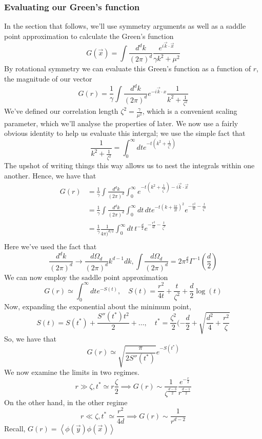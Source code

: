 \subsubsection{Evaluating our Green's function} 
In the section that follows, we'll use symmetry arguments 
as well as a saddle point approximation to calculate the Green's function 
\[
	G ( \vec{x} ) = \int \frac{ d^ d k }{ ( 2 \pi ) ^ d } \frac{ e^{ i \vec{k} \cdot  \vec{x}  }}{ \gamma k^2 + \mu ^ 2 }
\] By rotational symmetry we can evaluate this Green's function as 
a function of $ r $, the magnitude of our vector 
\[
	G ( r)  =\frac{1}{\gamma } \int \frac{ d^ d k }{ ( 2 \pi ) ^ d } e^{  - i \vec{k} \cdot  x } \frac{1}{ k^ 2 + \frac{1}{ \zeta ^ 2 }}
\] We've defined our correlation length $ \zeta^ 2 = \frac{ \gamma }{ \mu^ 2 }$, which 
is a convenient scaling parameter, which we'll analyse the properties of later.  
We now use a fairly obvious identity to help us evaluate this intergal; we use 
the simple fact that 
\[
	\frac{1}{ k ^ 2 + \frac{1}{ \zeta ^ 2} } = \int_0^\infty dt e^{  - t ( k^ 2 + \frac{1}{\zeta ^ 2} ) }
\] The upshot of writing things this way allows us 
to nest the integrals within one another. Hence, we have that  
\begin{align*}
	G ( r) &=  \frac{1}{\gamma} \int \frac{d^ d k }{ ( 2 \pi ) ^ d } \int_0^\infty e^{  - t ( k^ 2 + \frac{1}{\zeta ^ 2 }) - i \vec{k} \cdot  \vec{x} } \\
	       &=  \frac{1}{\gamma } \int \frac{d^ d k }{ ( 2 \pi ) ^ d } \int_0^\infty dt \, dt e^{  - t ( k + \frac{ i x }{2t  })^ 2 }e^{  - \frac{r^ 2 }{ 4t }  - \frac{t}{\zeta^ 2 }} \\
	       &=  \frac{1}{\gamma } \frac{1}{4 \pi )^{ d / 2}} \int_0^\infty dt \, t ^{  - \frac{d}{2 } } e^{  - \frac{r^ 2 }{ 4t }  - \frac{t}{\zeta^ 2 }} \\
\end{align*}
Here we've used the fact that 
\[
	\frac{ d^ d k }{ ( 2\pi ) ^ d } \to \frac{ d \Omega_d }{ ( 2 \pi ) ^ d} k^{ d - 1 } dk, \int \frac{ d \Omega_d }{ ( 2 \pi ) ^ d }  = 2 \pi^{ \frac{d}{ 2}} \Gamma^{ -1} ( \frac{d}{2 } ) 
\] We can now employ the saddle point approximation 
\[
	G ( r) \simeq \int_0^\infty dt e^{ - S( t ) }, \quad S( t ) = \frac{r^ 2 }{ 4t } + \frac{t}{\zeta^ 2 }+ \frac{d}{ 2 }\log ( t) 
\]  Now, expanding the exponential about the minimum point, 
\[
	S( t) = S( t^* ) + \frac{ S'' ( t^ * ) t^ 2 }{ 2 } + \dots, \quad t^ * = \frac{\zeta^ 2 }{2 } ( - \frac{d}{2 } + \sqrt{ \frac{d^2}{4 } + \frac{r^2}{\zeta}} 
\] So, we have that 
\[
	G ( r) \simeq \sqrt{ \frac{ \pi }{ 2 S'' ( t^ * ) }}e^{  - S( t^ * ) } 
\] We now examine the limits in two regimes. 
\[
	r \gg \zeta, t^ * \simeq r \frac{\zeta}{2 } \implies G ( r) \sim \frac{1}{\zeta^{ \frac{d - 3 }{2 }}} \frac{ e^{  -\frac{r}{2 }}}{r^{ \frac{d - 1 }{ 2}}}
\] On the other hand, in the other regime 
\[
	r \ll \zeta, t^ * \simeq \frac{r^ 2 }{ 4 d } \implies G ( r) \sim \frac{1}{r^{ d - 2 }}
\] Recall, $ G( r) = \left< \phi( \vec{y} ) \phi ( \vec{x} )  \right> $
\pagebreak 

